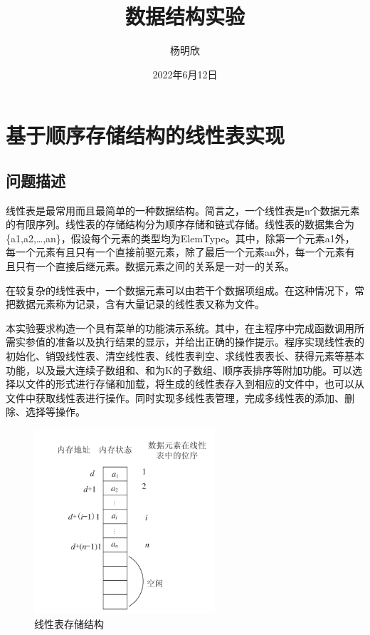 \documentclass[supercite]{Experimental_Report}
\title{~~~~~~数据结构实验~~~~~~}
\author{杨明欣}
\date{2022年6月12日}
\theoremstyle{definition}
\begin{document}
\maketitle

\clearpage


\tableofcontents[level=2]

\clearpage


\section{基于顺序存储结构的线性表实现}

\subsection{问题描述}

线性表是最常用而且最简单的一种数据结构。简言之，一个线性表是n个数据元素的有限序列。线性表的存储结构分为顺序存储和链式存储。线性表的数据集合为\{a1,a2,…,an\}，假设每个元素的类型均为ElemType。其中，除第一个元素a1外，每一个元素有且只有一个直接前驱元素，除了最后一个元素an外，每一个元素有且只有一个直接后继元素。数据元素之间的关系是一对一的关系。

在较复杂的线性表中，一个数据元素可以由若干个数据项组成。在这种情况下，常把数据元素称为记录，含有大量记录的线性表又称为文件。

本实验要求构造一个具有菜单的功能演示系统。其中，在主程序中完成函数调用所需实参值的准备以及执行结果的显示，并给出正确的操作提示。程序实现线性表的初始化、销毁线性表、清空线性表、线性表判空、求线性表表长、获得元素等基本功能，以及最大连续子数组和、和为K的子数组、顺序表排序等附加功能。可以选择以文件的形式进行存储和加载，将生成的线性表存入到相应的文件中，也可以从文件中获取线性表进行操作。同时实现多线性表管理，完成多线性表的添加、删除、选择等操作。


 \begin{figure}[H]
 	\centering
 	\includegraphics[width=0.6\textwidth]{images/线性表.png}
 	\caption{线性表存储结构}
 	\label{txlab}
 \end{figure}
\end{document}
